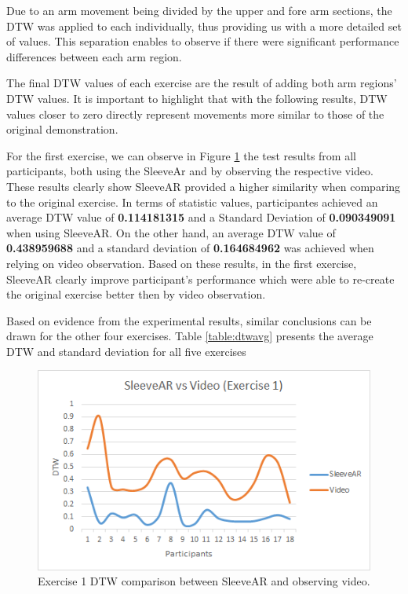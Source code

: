 Due to an arm movement being divided by the upper and fore arm sections, the \ac{DTW} was applied to each individually, thus providing us with a more detailed set of values. This separation enables to observe if there were significant performance differences between each arm region.

The final \ac{DTW} values of each exercise are the result of adding both arm regions' DTW values. It is important to highlight that with the following results, DTW values closer to zero directly represent movements more similar to those of the original demonstration.


For the first exercise, we can observe in Figure \ref{fig:sleevearVSvideoEx1} the test results from all participants, both using the SleeveAr and by observing the respective video.
These results clearly show SleeveAR provided a higher similarity when comparing to the original exercise. 
In terms of statistic values, participantes achieved an average \ac{DTW} value of \textbf{0.114181315} and a Standard Deviation of \textbf{0.090349091} when using SleeveAR.
On the other hand, an average \ac{DTW} value of \textbf{0.438959688} and a standard deviation of \textbf{0.164684962} was achieved when relying on video observation. 
Based on these results, in the first exercise, SleeveAR clearly improve participant's performance which were able to re-create the original exercise better then by video observation. 

Based on evidence from the experimental results, similar conclusions can be drawn for the other four exercises. Table \ref{table:dtwavg} presents the average DTW and standard deviation for all five exercises 

\begin{figure}[t!]
    \centering
    \includegraphics{imgs/results/sleevearVSvideoEx1.png}
    \caption{Exercise 1 DTW comparison between SleeveAR and observing video.}
    \label{fig:sleevearVSvideoEx1}
\end{figure}



